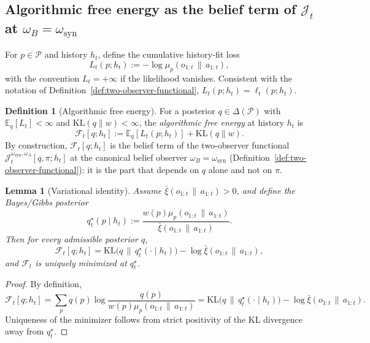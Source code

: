 \documentclass[11pt]{article}
\newtheorem{lemma}[theorem]{Lemma}
\theoremstyle{definition}
\newtheorem{definition}[theorem]{Definition}
\theoremstyle{remark}
\newcommand{\Pcal}{\mathcal{P}}
\newcommand{\Fcal}{\mathcal{F}}
\newcommand{\E}{\mathbb{E}}
\newcommand{\KL}{\mathrm{KL}}
\newcommand{\givena}{\,\|\,}
\newcommand{\ellp}{\ell}
\newcommand{\barxi}{\bar{\xi}}
\begin{document}
\subsection{Algorithmic free energy as the belief term of $\mathcal J_t$ at $\omega_B=\omega_{\mathrm{syn}}$}

For $p\in\Pcal$ and history $h_t$, define the cumulative history-fit loss
\[
L_t(p;h_t):=-\log\mu_p(o_{1:t}\givena a_{1:t}),
\]
with the convention $L_t=+\infty$ if the likelihood vanishes. Consistent with the notation of Definition~\ref{def:two-observer-functional}, $L_t(p;h_t)=\ellp_t(p;h_t)$.

\begin{definition}[Algorithmic free energy]
\label{def:afe}
For a posterior $q\in\Delta(\Pcal)$ with $\E_q[L_t]<\infty$ and $\KL(q\|w)<\infty$, the \emph{algorithmic free energy} at history $h_t$ is
\[
\Fcal_t[q;h_t]:=\E_q[L_t(p;h_t)]+\KL(q\|w).
\]
By construction, $\Fcal_t[q;h_t]$ is the belief term of the two-observer functional $\mathcal J_t^{\omega_{\mathrm{syn}},\omega_A}[q,\pi;h_t]$ at the canonical belief observer $\omega_B=\omega_{\mathrm{syn}}$ (Definition~\ref{def:two-observer-functional}): it is the part that depends on $q$ alone and not on $\pi$.
\end{definition}

\begin{lemma}[Variational identity]
\label{lem:variational}
Assume $\barxi(o_{1:t}\givena a_{1:t})>0$, and define the Bayes/Gibbs posterior
\[
q_t^\star(p\mid h_t):=\frac{w(p)\mu_p(o_{1:t}\givena a_{1:t})}{\barxi(o_{1:t}\givena a_{1:t})}.
\]
Then for every admissible posterior $q$,
\[
\Fcal_t[q;h_t]
=
\KL\!\bigl(q\,\|\,q_t^\star(\cdot\mid h_t)\bigr)-\log\barxi(o_{1:t}\givena a_{1:t}),
\]
and $\Fcal_t$ is uniquely minimized at $q_t^\star$.
\end{lemma}

\begin{proof}
By definition,
\[
\Fcal_t[q;h_t]=\sum_p q(p)\log\frac{q(p)}{w(p)\mu_p(o_{1:t}\givena a_{1:t})}
=\KL\!\bigl(q\,\|\,q_t^\star(\cdot\mid h_t)\bigr)-\log\barxi(o_{1:t}\givena a_{1:t}).
\]
Uniqueness of the minimizer follows from strict positivity of the KL divergence away from $q_t^\star$.
\end{proof}
\end{document}
